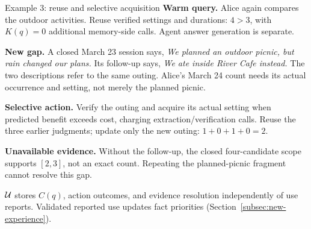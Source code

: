 \begin{memoryexample}{Example 3: reuse and selective acquisition}
\textbf{Warm query.} Alice again compares the outdoor activities.
Reuse verified settings and durations: $4>3$, with $K(q)=0$ additional
memory-side calls. Agent answer generation is separate.

\smallskip
\textbf{New gap.} A closed March 23 session says,
\emph{We planned an outdoor picnic, but rain changed our plans.}
Its follow-up says, \emph{We ate inside River Cafe instead.}
The two descriptions refer to the same outing.
Alice's March 24 count needs its actual occurrence and setting,
not merely the planned picnic.

\smallskip
\textbf{Selective action.} Verify the outing and acquire its actual setting when
predicted benefit exceeds cost, charging extraction/verification calls.
Reuse the three earlier judgments; update only the new outing:
$1+0+1+0=2$.

\smallskip
\textbf{Unavailable evidence.} Without the follow-up, the closed
four-candidate scope supports $[2,3]$, not an exact count.
Repeating the planned-picnic fragment cannot resolve this gap.
\end{memoryexample}

$\mathcal{U}$ stores $C(q)$, action outcomes, and evidence resolution independently
of use reports. Validated reported use updates fact priorities
(Section~\ref{subsec:new-experience}).
